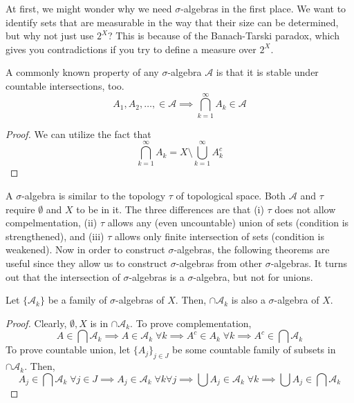 \documentclass{article}
\begin{document}
    At first, we might wonder why we need $\sigma$-algebras in the first place. We want to identify sets that are measurable in the way that their size can be determined, but why not just use $2^X$? This is because of the Banach-Tarski paradox, which gives you contradictions if you try to define a measure over $2^X$.  

    \begin{lemma}
      A commonly known property of any $\sigma$-algebra $\mathcal{A}$ is that it is stable under countable intersections, too. 
      \begin{equation}
        A_1, A_2, \ldots, \in \mathcal{A} \implies \bigcap_{k=1}^\infty A_k \in \mathcal{A}
      \end{equation}
    \end{lemma}
    \begin{proof}
      We can utilize the fact that 
      \begin{equation}
        \bigcap_{k=1}^\infty A_k = X \setminus \bigcup_{k=1}^\infty A_k^c
      \end{equation}
    \end{proof}

    A $\sigma$-algebra is similar to the topology $\tau$ of topological space. Both $\mathcal{A}$ and $\tau$ require $\emptyset$ and $X$ to be in it. The three differences are that (i) $\tau$ does not allow compelmentation, (ii) $\tau$ allows any (even uncountable) union of sets (condition is strengthened), and (iii) $\tau$ allows only finite intersection of sets (condition is weakened). Now in order to construct $\sigma$-algebras, the following theorems are useful since they allow us to construct $\sigma$-algebras from other $\sigma$-algebras. It turns out that the intersection of $\sigma$-algebras is a $\sigma$-algebra, but not for unions. 

    \begin{theorem}
      Let $\{\mathcal{A}_k\}$ be a family of $\sigma$-algebras of $X$. Then, $\cap \mathcal{A}_k$ is also a $\sigma$-algebra of $X$. 
    \end{theorem}
    \begin{proof}
      Clearly, $\emptyset, X$ is in $\cap \mathcal{A}_k$. To prove complementation, 
      \begin{equation}
        A \in \bigcap \mathcal{A}_k \implies A \in \mathcal{A}_k \; \forall k \implies A^c \in A_k \; \forall k \implies A^c \in \bigcap \mathcal{A}_k
      \end{equation}
      To prove countable union, let $\{A_j\}_{j \in J}$ be some countable family of subsets in $\cap \mathcal{A}_k$. Then, 
      \begin{equation}
        A_j \in \bigcap \mathcal{A}_k \; \forall j \in J \implies A_j \in \mathcal{A}_k \; \forall k \forall j \implies \bigcup A_j \in \mathcal{A}_k \; \forall k \implies \bigcup A_j \in \bigcap \mathcal{A}_k
      \end{equation}
    \end{proof}
\end{document}
